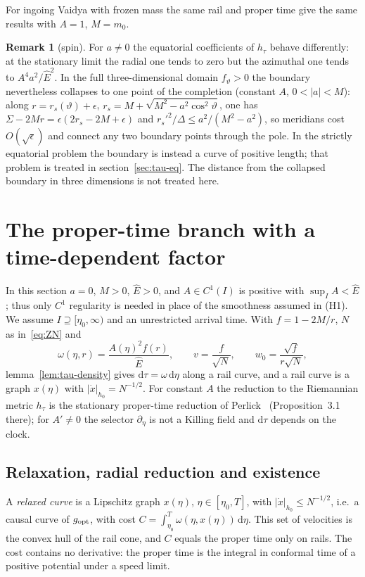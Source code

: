 \documentclass[aip,jmp,amsmath,amssymb,reprint]{revtex4-2}
\newcommand{\Ehat}{\hat E}
\newcommand{\dd}{\mathrm{d}}
\newcommand{\gopt}{g_{\rm opt}}
\theoremstyle{plain}
\theoremstyle{definition}
\newtheorem{remark}[proposition]{Remark}
\begin{document}
For ingoing Vaidya with
frozen mass the same rail and proper time give the same results with $A=1$, $M=m_0$.

\begin{remark}[spin]
For $a\neq0$ the equatorial coefficients of $h_\tau$ behave differently: at the stationary
limit the radial one tends to zero but the azimuthal one tends to $A^4a^2/\Ehat^2$. In the full
three-dimensional domain $f_\vartheta>0$ the boundary nevertheless collapses to one point of
the completion (constant $A$, $0<|a|<M$): along $r=r_s(\vartheta)+\epsilon$,
$r_s=M+\sqrt{M^2-a^2\cos^2\vartheta}$, one has $\Sigma-2Mr=\epsilon(2r_s-2M+\epsilon)$ and
$r_s'^2/\Delta\le a^2/(M^2-a^2)$, so meridians cost
$O(\sqrt\epsilon)$ and connect any two boundary points through the pole. In the strictly
equatorial problem the boundary is instead a curve of positive length; that problem is treated
in section~\ref{sec:tau-eq}. The distance from the collapsed boundary in three dimensions is not
treated here.
\end{remark}

\section{The proper-time branch with a time-dependent factor}
\label{sec:tau-var}
In this section $a=0$, $M>0$, $\Ehat>0$, and $A\in C^1(I)$ is positive with $\sup_IA<\Ehat$;
thus only $C^1$ regularity is needed in place of the smoothness assumed in (H1). We assume
$I\supseteq[\eta_0,\infty)$ and an unrestricted arrival time. With $f=1-2M/r$, $N$ as
in~\eqref{eq:ZN} and
\[
  \omega(\eta,r)=\frac{A(\eta)^2f(r)}{\Ehat},\qquad
  v=\frac{f}{\sqrt N},\qquad
  w_0=\frac{\sqrt f}{r\sqrt N},
\]
lemma~\ref{lem:tau-density} gives $\dd\tau=\omega\,\dd\eta$ along a rail curve, and a rail
curve is a graph $x(\eta)$ with $|\dot x|_{h_0}=N^{-1/2}$. For constant $A$ the reduction to
the Riemannian metric $h_\tau$ is the stationary proper-time reduction of
Perlick~\cite{Perlick1991} (Proposition~3.1 there); for $A'\neq0$ the selector $\partial_\eta$ is not a
Killing field and $\dd\tau$ depends on the clock.

\subsection{Relaxation, radial reduction and existence}
A \emph{relaxed curve} is a Lipschitz graph $x(\eta)$, $\eta\in[\eta_0,T]$, with
$|\dot x|_{h_0}\le N^{-1/2}$, i.e.\ a causal curve of $\gopt$, with cost
$C=\int_{\eta_0}^T\omega(\eta,x(\eta))\,\dd\eta$. This set of velocities is the convex hull of
the rail cone, and $C$ equals the proper time only on rails. The cost contains no
derivative: the proper time is the integral in conformal time of a positive potential
under a speed limit.
\end{document}
